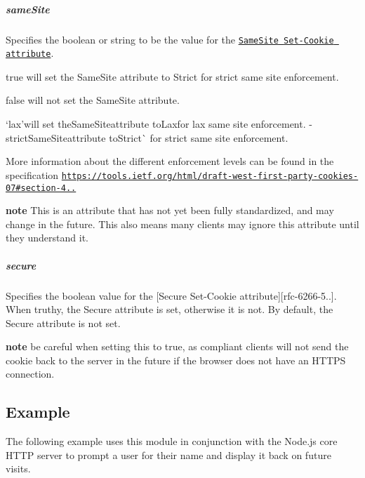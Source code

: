\subparagraph*{same\+Site}

Specifies the {\ttfamily boolean} or {\ttfamily string} to be the value for the \href{https://tools.ietf.org/html/draft-west-first-party-cookies-07}{\tt {\ttfamily Same\+Site} {\ttfamily Set-\/\+Cookie} attribute}.


\begin{DoxyItemize}
\item {\ttfamily true} will set the {\ttfamily Same\+Site} attribute to {\ttfamily Strict} for strict same site enforcement.
\item {\ttfamily false} will not set the {\ttfamily Same\+Site} attribute.
\item `\textquotesingle{}lax'{\ttfamily will set the}Same\+Site{\ttfamily attribute to}Lax{\ttfamily for lax same site enforcement. -\/}\textquotesingle{}strictSame\+Site{\ttfamily attribute to}Strict\`{} for strict same site enforcement.
\end{DoxyItemize}

More information about the different enforcement levels can be found in the specification \href{https://tools.ietf.org/html/draft-west-first-party-cookies-07#section-4.1.1}{\tt https\+://tools.\+ietf.\+org/html/draft-\/west-\/first-\/party-\/cookies-\/07\#section-\/4..}

{\bfseries note} This is an attribute that has not yet been fully standardized, and may change in the future. This also means many clients may ignore this attribute until they understand it.

\subparagraph*{secure}

Specifies the {\ttfamily boolean} value for the \mbox{[}{\ttfamily Secure} {\ttfamily Set-\/\+Cookie} attribute\mbox{]}\mbox{[}rfc-\/6266-\/5..\mbox{]}. When truthy, the {\ttfamily Secure} attribute is set, otherwise it is not. By default, the {\ttfamily Secure} attribute is not set.

{\bfseries note} be careful when setting this to {\ttfamily true}, as compliant clients will not send the cookie back to the server in the future if the browser does not have an H\+T\+T\+PS connection.

\subsection*{Example}

The following example uses this module in conjunction with the Node.\+js core H\+T\+TP server to prompt a user for their name and display it back on future visits.


